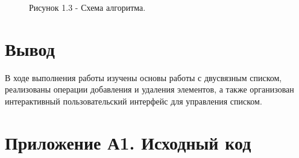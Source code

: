\documentclass[oneside,a4paper,14pt]{extarticle}
\begin{document}
\begin{figure}[!ht]
	\centering
	\caption*{Рисунок 1.3 - Схема алгоритма.}
\end{figure}

\section*{Вывод}

В ходе выполнения работы изучены основы работы с двусвязным списком, реализованы операции добавления и удаления элементов, а также организован интерактивный пользовательский интерфейс для управления списком.

\newpage
\section*{Приложение А1. Исходный код}

\end{document}
